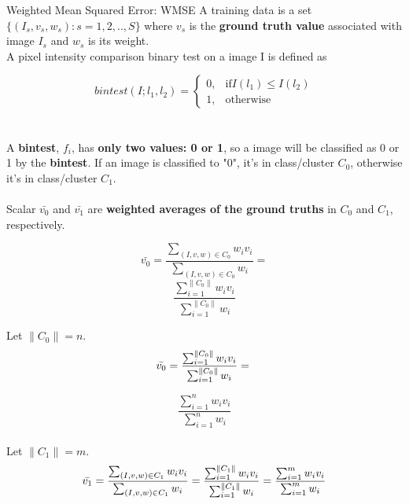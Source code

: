 \begin{compactitem}
\item{Weighted Mean Squared Error: WMSE}
A training data is a set $\{(I_s,v_s,w_s) : s=1,2,..,S\}$
where $v_s$ is the \textbf{ground truth value} associated with image $I_s$ and $w_s$ is its weight.
\\ A pixel intensity comparison binary test on a image I is defined as

\begin{equation}
\label{eq:bintest}
    bintest(I;l_1,l_2)=
\begin{cases}
    0,		& \text{if} I(l_1)\leq I(l_2)\\
    1,      & \text{otherwise}
\end{cases}
\end{equation}\\
\\ A \textbf{bintest}, $f_i$, has \textbf{only two values: 0 or 1}, so a image will be classified as 0 or 1 by the \textbf{bintest}. If an image is classified to "0", it's in class/cluster $C_0$, otherwise it's in class/cluster $C_1$. \\
\\ Scalar $\bar{v_0}$ and $\bar{v_1}$ are \textbf{weighted averages of the ground truths} in $C_0$ and $C_1$, respectively.

\begin{equation}
\label{eq:WAGT0}
\bar{v_0}=\frac{\sum\nolimits_{(I,v,w) \in C_0} w_i v_i} { \sum\nolimits_{(I,v,w) \in C_0} w_i} =
\end{equation}
\[
\frac{\sum_{i=1}^{\| C_0 \|}  w_i v_i}
{\sum_{i=1}^{\| C_0 \|}  w_i}
\]

Let $\| C_{0} \|=n$.\\
\[
\bar{v_0}=\frac{\sum_{i=1}^{\| C_0 \|}  w_i v_i}
{\sum_{i=1}^{\| C_0 \|}  w_i}=\\
\]

\begin{equation}
\label{eq:WAGT0-1}
\frac{\sum_{i=1}^{n}  w_i v_i}
{\sum_{i=1}^{n}  w_i}
\end{equation}
\\

Let $\| C_{1} \|=m$.\\
\begin{equation}
\label{eq:WAGT1}
\bar{v_1}=\frac{\sum\nolimits_{(I,v,w) \in C_1} w_i v_i} { \sum\nolimits_{(I,v,w) \in C_1} w_i} =
\frac{\sum_{i=1}^{\| C_1 \|}  w_i v_i}
{\sum_{i=1}^{\| C_1 \|}  w_i}=\\
\frac{\sum_{i=1}^{m}  w_i v_i}
{\sum_{i=1}^{m}  w_i}
\end{equation}
\\


\end{compactitem}
